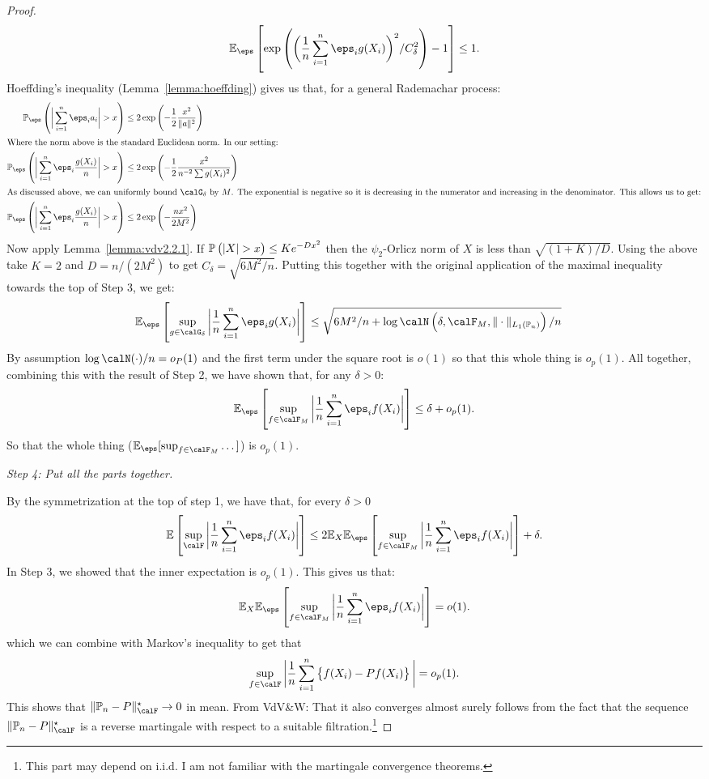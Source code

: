 \begin{proof}
	 \[
		 \E_\eps\left[\exp\left(\bigg(\frac{1}{n}\sum_{i=1}^n \eps_ig(X_i)\bigg)^2/C_\delta^2\right)-1\right]\leq 1
	.\] 
	Hoeffding's inequality (Lemma~\ref{lemma:hoeffding}) gives us that, for a general Rademachar process:
	\begin{align*}
		\P_\eps\left(\bigg|\sum_{i=1}^n \eps_ia_i\bigg|>x\right) &\leq 2\exp\left(-\frac{1}{2}\frac{x^2}{\|a\|^2}\right)\\
		\intertext{Where the norm above is the standard Euclidean norm. In our setting:}
		\P_\eps\left(\bigg|\sum_{i=1}^n \eps_i\frac{g(X_i)}{n} \bigg| > x\right) &\leq 2\exp\left(-\frac{1}{2}\frac{x^2}{n^{-2}\sum g(X_i)^2} \right)\\
		\intertext{As discussed above, we can uniformly bound  \(\calG_\delta\) by  \(M\). The exponential is negative so it is decreasing in the numerator and increasing in the denominator. This allows us to get:} 
		\P_\eps\left(\bigg|\sum_{i=1}^n \eps_i\frac{g(X_i)}{n} \bigg| > x\right) &\leq 2\exp\left(-\frac{n x^2}{2M^2} \right)
	\end{align*}
	Now apply Lemma~\ref{lemma:vdv2.2.1}. If \(\P\left(|X|>x\right)\leq Ke^{-Dx^2}\) then the \(\psi_2\)-Orlicz norm of \(X\) is less than  \(\sqrt{(1+K)/D}\). Using the above take \(K=2\) and \(D = n/(2M^2)\) to get \(C_\delta = \sqrt{6M^2/n}\). Putting this together with the original application of the maximal inequality towards the top of Step 3, we get:
	\begin{align*}
		\E_\eps\left[\sup_{g\in\calG_\delta}\bigg|\frac{1}{n}\sum_{i=1}^n \eps_ig(X_i)\bigg|\right]&\leq \sqrt{6M^2/n + \log\calN\left(\delta,\calF_M,\|\cdot\|_{L_1(\P_n)}\right)/n}
	\end{align*}
	By assumption \(\log\calN(\cdot)/n = o_P(1)\) and the first term under the square root is \(o(1)\) so that this whole thing is \(o_p(1)\). All together, combining this with the result of Step 2, we have shown that, for any \(\delta > 0\):
	\[
		\E_\eps\left[\sup_{f\in\calF_M}\bigg|\frac{1}{n}\sum_{i=1}^n \eps_if(X_i)\bigg|\right] \leq \delta + o_p(1) 
	.\] 
	So that the whole thing (\(\E_\eps[\sup_{f\in\calF_M}\dots]\)) is \(o_p(1)\). 

	\textit{Step 4: Put all the parts together.}
	
	By the symmetrization at the top of step 1, we have that, for every \(\delta > 0\)
	 \[
		 \E\left[\sup_{\calF}\bigg|\frac{1}{n}\sum_{i=1}^n \eps_if(X_i) \bigg|\right] \leq  2\E_X\E_\eps\left[\sup_{f\in\calF_M}\bigg|\frac{1}{n}\sum_{i=1}^n \eps_if(X_i)\bigg|\right] + \delta 
	.\] 
	In Step 3, we showed that the inner expectation is \(o_p(1)\). This gives us that:
	\[
		\E_X\E_\eps\left[\sup_{f\in\calF_M}\bigg|\frac{1}{n}\sum_{i=1}^n \eps_if(X_i)\bigg|\right] = o(1)
	.\] 
	which we can combine with Markov's  inequality to get that
	\[
		\sup_{f\in\calF}\bigg|\frac{1}{n}\sum_{i=1}^n \left\{f(X_i) - Pf(X_i)\right\}\bigg| = o_p(1)
	.\]
	This shows that \(\|\P_n-P\|_\calF^\star \to 0\) in mean. From VdV\&W: That it also converges almost surely follows from the fact that the sequence \(\|\P_n-P\|_\calF^\star\) is a reverse martingale with respect to a suitable filtration.\footnote{This part may depend on i.i.d. I am not familiar with the martingale convergence theorems.}  
\end{proof}

